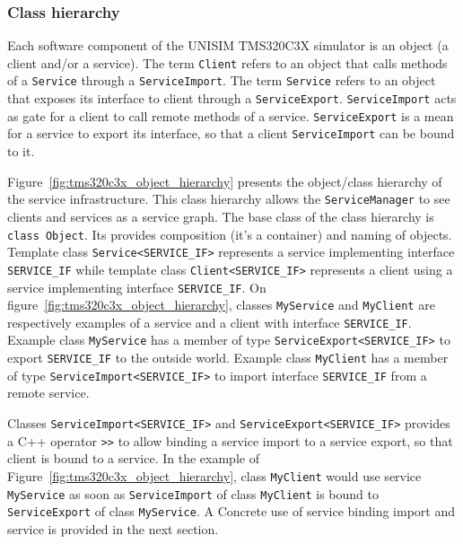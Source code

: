 \subsubsection{Class hierarchy}

Each software component of the UNISIM TMS320C3X simulator is an object (a client and/or a service). The term \texttt{Client} refers to an object that calls methods of a \texttt{Service} through a \texttt{ServiceImport}. The term \texttt{Service} refers to an object that exposes its interface to client through a \texttt{ServiceExport}. \texttt{ServiceImport} acts as gate for a client to call remote methods of a service. \texttt{ServiceExport} is a mean for a service to export its interface, so that a client \texttt{ServiceImport} can be bound to it.

Figure~\ref{fig:tms320c3x_object_hierarchy} presents the object/class hierarchy of the service infrastructure. This class hierarchy allows the \texttt{ServiceManager} to see clients and services as a service graph. The base class of the class hierarchy is \texttt{class Object}. Its provides composition (it's a container) and naming of objects. Template class \texttt{Service<SERVICE\_IF>} represents a service implementing interface \texttt{SERVICE\_IF} while template class \texttt{Client<SERVICE\_IF>} represents a client using a service implementing interface \texttt{SERVICE\_IF}. On figure~\ref{fig:tms320c3x_object_hierarchy}, classes \texttt{MyService} and \texttt{MyClient} are respectively examples of a service and a client with interface \texttt{SERVICE\_IF}. Example class \texttt{MyService} has a member of type \texttt{ServiceExport<SERVICE\_IF>} to export \texttt{SERVICE\_IF} to the outside world. Example class \texttt{MyClient} has a member of type \texttt{ServiceImport<SERVICE\_IF>} to import interface \texttt{SERVICE\_IF} from a remote service.

Classes \texttt{ServiceImport<SERVICE\_IF>} and \texttt{ServiceExport<SERVICE\_IF>} provides a C++ operator \texttt{>>} to allow binding a service import to a service export, so that client is bound to a service. In the example of Figure~\ref{fig:tms320c3x_object_hierarchy}, class \texttt{MyClient} would use service \texttt{MyService} as soon as \texttt{ServiceImport} of class \texttt{MyClient} is bound to \texttt{ServiceExport} of class \texttt{MyService}.
A Concrete use of service binding import and service is provided in the next section.

